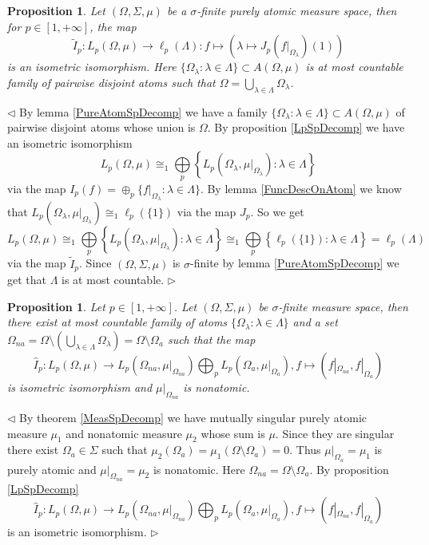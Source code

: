 \documentclass[12pt]{article}
\newtheorem{proposition}[theorem]{Proposition}
\newenvironment{proof}{\par $\triangleleft$}{$\triangleright$}
\begin{document}
\begin{proposition}\label{DescOfLpSpOnPureAtomMeasSp} Let $(\Omega,\Sigma,\mu)$ be a $\sigma$-finite purely atomic measure space, then for $p\in[1,+\infty]$, the map
$$
\widetilde{I}_p:L_p(\Omega,\mu)\to \ell_p(\Lambda):f\mapsto\left (\lambda\mapsto J_p(f|_{\Omega_\lambda})(1)\right)
$$
is an isometric isomorphism. Here $\{\Omega_\lambda:\lambda\in\Lambda\}\subset A(\Omega,\mu)$ is at most countable family of pairwise disjoint atoms such that $\Omega=\bigcup_{\lambda\in\Lambda}\Omega_\lambda$.
\end{proposition}
\begin{proof}
By lemma \ref{PureAtomSpDecomp} we have a family $\{\Omega_\lambda:\lambda\in\Lambda\}\subset A(\Omega,\mu)$ of pairwise disjoint atoms whose union is $\Omega$. By proposition \ref{LpSpDecomp} we have an isometric isomorphism
$$
L_p(\Omega,\mu)
\cong_1 \bigoplus\limits_p \left\{L_p(\Omega_\lambda,\mu|_{\Omega_\lambda}):\lambda\in\Lambda\right\}
$$
via the map $I_p(f)=\oplus_p \{f|_{\Omega_\lambda}:\lambda\in\Lambda\}$. By lemma \ref{FuncDescOnAtom} we know that $L_p(\Omega_\lambda,\mu|_{\Omega_\lambda})\cong_1\ell_p(\{1\})$ via the map $J_p$. So we get
$$
L_p(\Omega,\mu)
\cong_1 \bigoplus\limits_p \left\{L_p(\Omega_\lambda,\mu|_{\Omega_\lambda}):\lambda\in\Lambda\right\}
\cong_1 \bigoplus\limits_p \left\{\ell_p(\{1\}):\lambda\in\Lambda\right\}
=\ell_p(\Lambda)
$$
via the map $\widetilde{I}_p$. Since $(\Omega,\Sigma,\mu)$ is $\sigma$-finite by lemma \ref{PureAtomSpDecomp} we get that $\Lambda$ is at most countable.
\end{proof}

\begin{proposition}\label{DescOfLpSpOnMeasSp} Let $p\in[1,+\infty]$. Let $(\Omega,\Sigma,\mu)$ be $\sigma$-finite measure space, then there exist at most countable family of atoms $\{\Omega_\lambda:\lambda\in\Lambda\}$ and a set $\Omega_{na}=\Omega\setminus\left(\bigcup_{\lambda\in\Lambda}\Omega_\lambda\right)=\Omega\setminus\Omega_{a}$ such that the map
$$
\hat{I}_p:L_p(\Omega,\mu)\to L_p(\Omega_{na},\mu|_{\Omega_{na}})\bigoplus_{p}L_p(\Omega_{a},\mu|_{\Omega_{a}}),f\mapsto (f|_{\Omega_{na}},f|_{\Omega_{a}})
$$
is isometric isomorphism and $\mu|_{\Omega_{na}}$ is nonatomic.
\end{proposition}
\begin{proof} By theorem \ref{MeasSpDecomp} we have mutually singular purely atomic measure $\mu_1$ and nonatomic measure $\mu_2$ whose sum is $\mu$. Since they are singular there exist $\Omega_a\in\Sigma$ such that $\mu_2(\Omega_a)=\mu_1(\Omega\setminus\Omega_a)=0$. Thus $\mu|_{\Omega_a}=\mu_1$ is purely atomic and $\mu|_{\Omega_{na}}=\mu_2$ is nonatomic. Here $\Omega_{na}=\Omega\setminus\Omega_a$. By proposition \ref{LpSpDecomp}
$$
\hat{I}_p:L_p(\Omega,\mu)\to L_p(\Omega_{na},\mu|_{\Omega_{na}})\bigoplus_{p}L_p(\Omega_{a},\mu|_{\Omega_{a}}),f\mapsto (f|_{\Omega_{na}},f|_{\Omega_{a}})
$$
is an isometric isomorphism.
\end{proof}
\end{document}
